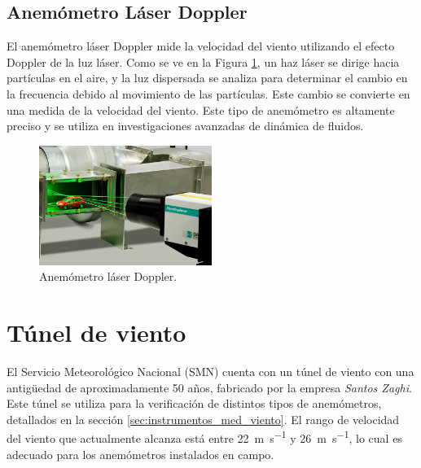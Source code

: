 \subsection*{Anemómetro Láser Doppler}

El anemómetro láser Doppler mide la velocidad del viento utilizando el efecto Doppler de la luz láser. Como se ve en la Figura \ref{fig:laserDoppler}, un haz láser se dirige hacia partículas en el aire, y la luz dispersada se analiza para determinar el cambio en la frecuencia debido al movimiento de las partículas. Este cambio se convierte en una medida de la velocidad del viento. Este tipo de anemómetro es altamente preciso y se utiliza en investigaciones avanzadas de dinámica de fluidos.

\begin{figure}[h]
    \centering
    \includegraphics[width=0.5\textwidth]{Figuras/viento/sensores/laserDoppler.png}
    \caption{Anemómetro láser Doppler. \cite{dantecLDA2024}}
    \label{fig:laserDoppler}
\end{figure}




\section{Túnel de viento}\label{tunelDeViento}

El Servicio Meteorológico Nacional (SMN) cuenta con un túnel de viento con una antigüedad de aproximadamente 50 años, fabricado por la empresa \textit{Santos Zaghi}. Este túnel se utiliza para la verificación de distintos tipos de anemómetros, detallados en la sección \ref{sec:instrumentos_med_viento}. El rango de velocidad del viento que actualmente alcanza está entre \SI{22}{\meter\per\second} y \SI{26}{\meter\per\second}, lo cual es adecuado para los anemómetros instalados en campo.

